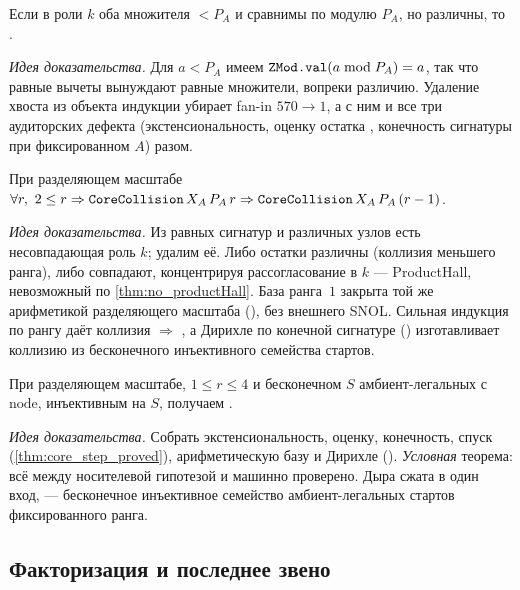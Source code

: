 \begin{theorem}\label{thm:no_productHall}
Если в роли $k$ оба множителя $<P_A$ и сравнимы по модулю $P_A$, но различны, то .
\end{theorem}

\emph{Идея доказательства.} Для $a<P_A$ имеем $\texttt{ZMod.val}(a\bmod P_A)=a$, так что равные вычеты
вынуждают равные множители, вопреки различию. \green{} Удаление хвоста из объекта индукции убирает
fan-in $570\to1$, а с ним и все три аудиторских дефекта (экстенсиональность, оценку остатка
, конечность сигнатуры при фиксированном $A$) разом.

\begin{theorem}\label{thm:core_step_proved}
При разделяющем масштабе $\forall r,\ 2\le r\Rightarrow\texttt{CoreCollision}\,X_A\,P_A\,r\Rightarrow
\texttt{CoreCollision}\,X_A\,P_A\,(r-1)$.
\end{theorem}

\emph{Идея доказательства.} Из равных сигнатур и различных узлов есть несовпадающая роль $k$; удалим
её. Либо остатки различны (коллизия меньшего ранга), либо совпадают, концентрируя рассогласование в
$k$ --- ProductHall, невозможный по \cref{thm:no_productHall}. \green{} База ранга~$1$ закрыта той же
арифметикой разделяющего масштаба (), без внешнего SNOL.
Сильная индукция по рангу даёт коллизия $\Rightarrow$ , а Дирихле по конечной сигнатуре
() изготавливает коллизию из бесконечного инъективного семейства
стартов.

\begin{theorem}\label{thm:product_core_engine_of_carrier}
При разделяющем масштабе, $1\le r\le4$ и бесконечном $S$ амбиент-легальных  с
$\mathrm{node}$, инъективным на $S$, получаем .
\end{theorem}

\emph{Идея доказательства.} Собрать экстенсиональность, оценку, конечность, спуск
(\cref{thm:core_step_proved}), арифметическую базу и Дирихле
(). \green{} \emph{Условная} теорема: всё между носителевой
гипотезой и  машинно проверено. Дыра сжата в один вход,  ---
бесконечное инъективное семейство амбиент-легальных стартов фиксированного ранга.

\subsection{Факторизация и последнее звено}

